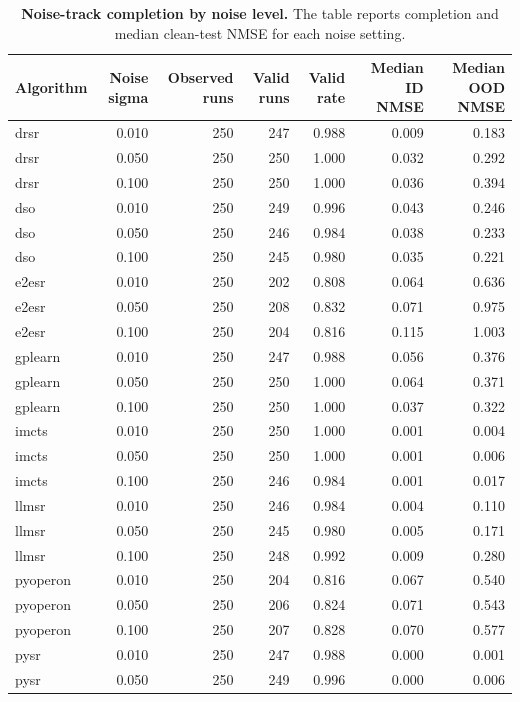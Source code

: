 \begin{table}
\caption{\textbf{Noise-track completion by noise level.} The table reports completion and median clean-test NMSE for each noise setting.}
\label{tab:table14_noise_by_sigma}
\begin{tabular}{lrrrrrr}
\toprule
\textbf{Algorithm} & \textbf{Noise sigma} & \textbf{Observed runs} & \textbf{Valid runs} & \textbf{Valid rate} & \textbf{Median ID NMSE} & \textbf{Median OOD NMSE} \\
\midrule
drsr & 0.010 & 250 & 247 & 0.988 & 0.009 & 0.183 \\
drsr & 0.050 & 250 & 250 & 1.000 & 0.032 & 0.292 \\
drsr & 0.100 & 250 & 250 & 1.000 & 0.036 & 0.394 \\
dso & 0.010 & 250 & 249 & 0.996 & 0.043 & 0.246 \\
dso & 0.050 & 250 & 246 & 0.984 & 0.038 & 0.233 \\
dso & 0.100 & 250 & 245 & 0.980 & 0.035 & 0.221 \\
e2esr & 0.010 & 250 & 202 & 0.808 & 0.064 & 0.636 \\
e2esr & 0.050 & 250 & 208 & 0.832 & 0.071 & 0.975 \\
e2esr & 0.100 & 250 & 204 & 0.816 & 0.115 & 1.003 \\
gplearn & 0.010 & 250 & 247 & 0.988 & 0.056 & 0.376 \\
gplearn & 0.050 & 250 & 250 & 1.000 & 0.064 & 0.371 \\
gplearn & 0.100 & 250 & 250 & 1.000 & 0.037 & 0.322 \\
imcts & 0.010 & 250 & 250 & 1.000 & 0.001 & 0.004 \\
imcts & 0.050 & 250 & 250 & 1.000 & 0.001 & 0.006 \\
imcts & 0.100 & 250 & 246 & 0.984 & 0.001 & 0.017 \\
llmsr & 0.010 & 250 & 246 & 0.984 & 0.004 & 0.110 \\
llmsr & 0.050 & 250 & 245 & 0.980 & 0.005 & 0.171 \\
llmsr & 0.100 & 250 & 248 & 0.992 & 0.009 & 0.280 \\
pyoperon & 0.010 & 250 & 204 & 0.816 & 0.067 & 0.540 \\
pyoperon & 0.050 & 250 & 206 & 0.824 & 0.071 & 0.543 \\
pyoperon & 0.100 & 250 & 207 & 0.828 & 0.070 & 0.577 \\
pysr & 0.010 & 250 & 247 & 0.988 & 0.000 & 0.001 \\
pysr & 0.050 & 250 & 249 & 0.996 & 0.000 & 0.006 \\

\end{tabular}
\end{table}
